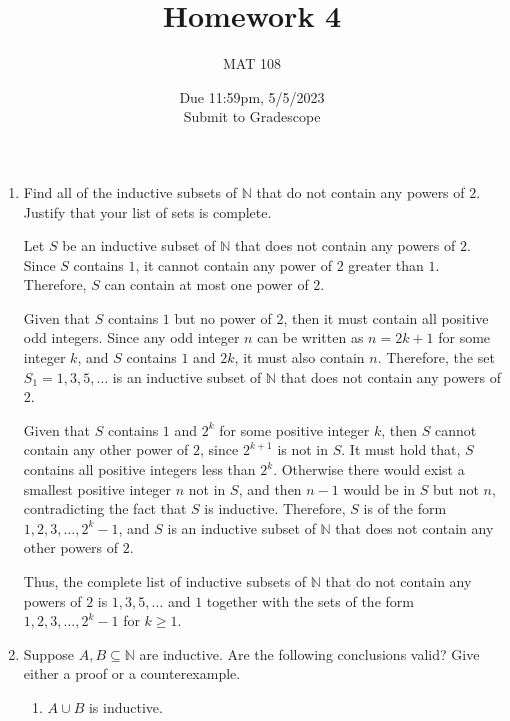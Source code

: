 \documentclass{article}
\title{Homework 4}
\author{MAT 108}
\date{Due 11:59pm, 5/5/2023\\ 
\vspace{0.1cm}
Submit to Gradescope}
\newcommand{\bN}{\mathbb{N}}
\begin{document}
\maketitle

{\large

\begin{enumerate}[labelindent=0pt,leftmargin=0pt]

    \setlength{\itemsep}{13pt} 

    \item Find all of the inductive subsets of $\bN$ that do not contain any powers of $2$. Justify that your list of sets is complete.

    Let $S$ be an inductive subset of $\bN$ that does not contain any powers of $2$. 
    Since $S$ contains $1$, it cannot contain any power of $2$ greater than $1$. 
    Therefore, $S$ can contain at most one power of $2$.
    
    Given that $S$ contains $1$ but no power of $2$, then it must contain all positive odd integers.
    Since any odd integer $n$ can be written as $n=2k+1$ for some integer $k$, and $S$ contains $1$ and $2k$, it must also contain $n$. 
    Therefore, the set $S_1={1,3,5,\ldots}$ is an inductive subset of $\bN$ that does not contain any powers of $2$.
    
    Given that $S$ contains $1$ and $2^k$ for some positive integer $k$, then $S$ cannot contain any other power of $2$, since $2^{k+1}$ is not in $S$. 
    It must hold that, $S$ contains all positive integers less than $2^k$. Otherwise there would exist a smallest positive integer $n$ not in $S$, and then $n-1$ would be in $S$ but not $n$, contradicting the fact that $S$ is inductive. 
    Therefore, $S$ is of the form ${1,2,3,\ldots,2^k-1}$, and $S$ is an inductive subset of $\bN$ that does not contain any other powers of $2$.
    
    Thus, the complete list of inductive subsets of $\bN$ that do not contain any powers of $2$ is ${1,3,5,\ldots}$ and ${1}$ together with the sets of the form ${1,2,3,\ldots,2^k-1}$ for $k\geq 1$.




    \item Suppose $A,B\subseteq\bN$ are inductive. Are the following conclusions valid? Give either a proof or a counterexample.

    \begin{enumerate}
    \item $A\cup B$ is inductive.
    

\end{enumerate}
\end{enumerate}}
\end{document}
